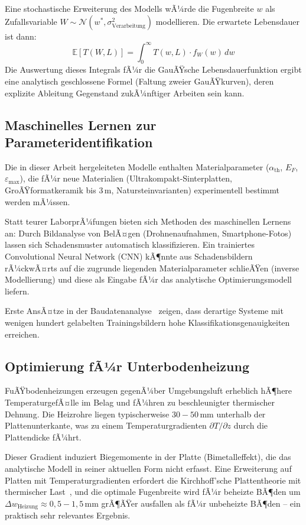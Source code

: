 ﻿\documentclass[a4paper,12pt]{article}
\theoremstyle{definition}
\begin{document}
Eine stochastische Erweiterung des Modells wÃ¼rde die Fugenbreite $w$
als Zufallsvariable $W \sim \mathcal{N}(w^*, \sigma_{\text{Verarbeitung}}^2)$
modellieren. Die erwartete Lebensdauer ist dann:
\[
\mathbb{E}[T(W, L)] = \int_0^\infty T(w, L) \cdot f_W(w) \, dw
\]
Die Auswertung dieses Integrals fÃ¼r die GauÃŸsche Lebensdauerfunktion
ergibt eine analytisch geschlossene Formel (Faltung zweier GauÃŸkurven),
deren explizite Ableitung Gegenstand zukÃ¼nftiger Arbeiten sein kann.

\subsection{Maschinelles Lernen zur Parameteridentifikation}

Die in dieser Arbeit hergeleiteten Modelle enthalten Materialparameter
($\alpha_{\text{th}}$, $E_F$, $\varepsilon_{\max}$), die fÃ¼r neue
Materialien (Ultrakompakt-Sinterplatten, GroÃŸformatkeramik bis $3\,\text{m}$,
Natursteinvarianten) experimentell bestimmt werden mÃ¼ssen.

Statt teurer LaborprÃ¼fungen bieten sich Methoden des maschinellen Lernens
an: Durch Bildanalyse von BelÃ¤gen (Drohnenaufnahmen, Smartphone-Fotos)
lassen sich Schadensmuster automatisch klassifizieren. Ein trainiertes
Convolutional Neural Network (CNN) kÃ¶nnte aus Schadensbildern rÃ¼ckwÃ¤rts
auf die zugrunde liegenden Materialparameter schlieÃŸen (inverse Modellierung)
und diese als Eingabe fÃ¼r das analytische Optimierungsmodell liefern.

Erste AnsÃ¤tze in der Baudatenanalyse~\cite{lecun2015} zeigen, dass
derartige Systeme mit wenigen hundert gelabelten Trainingsbildern
hohe Klassifikationsgenauigkeiten erreichen.

\subsection{Optimierung fÃ¼r Unterbodenheizung}

FuÃŸbodenheizungen erzeugen gegenÃ¼ber Umgebungsluft erheblich hÃ¶here
TemperaturgefÃ¤lle im Belag und fÃ¼hren zu beschleunigter thermischer
Dehnung. Die Heizrohre liegen typischerweise $30{-}50\,\text{mm}$
unterhalb der Plattenunterkante, was zu einem Temperaturgradienten
$\partial T/\partial z$ durch die Plattendicke fÃ¼hrt.

Dieser Gradient induziert Biegemomente in der Platte (Bimetalleffekt),
die das analytische Modell in seiner aktuellen Form nicht erfasst.
Eine Erweiterung auf Platten mit Temperaturgradienten erfordert die
Kirchhoff'sche Plattentheorie mit thermischer Last~\cite{timoshenko1959},
und die optimale Fugenbreite wird fÃ¼r beheizte BÃ¶den um
$\Delta w_{\text{Heizung}} \approx 0{,}5{-}1{,}5\,\text{mm}$ grÃ¶ÃŸer
ausfallen als fÃ¼r unbeheizte BÃ¶den -- ein praktisch sehr relevantes Ergebnis.
\end{document}
